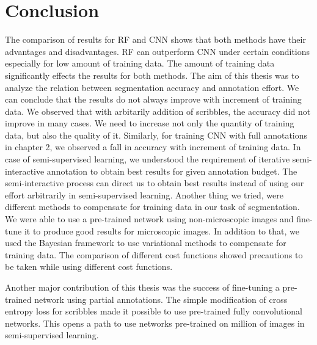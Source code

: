 %

\chapter{Conclusion}
The comparison of results for RF and CNN shows that both methods have their advantages and disadvantages. RF can outperform CNN under certain conditions especially for low amount of training data. The amount of training data significantly effects the results for both methods. The aim of this thesis was to analyze the relation between segmentation accuracy and annotation effort. We can conclude that the results do not always improve with increment of training data. We observed that with arbitarily addition of scribbles, the accuracy did not improve in many cases. We need to increase not only the quantity of training data, but also the quality of it. Similarly, for training CNN with full annotations in chapter 2, we observed a fall in accuracy with increment of training data.
In case of semi-supervised learning, we understood the requirement of iterative semi-interactive annotation to obtain best results for given annotation budget. The semi-interactive process can direct us to obtain best results instead of using our effort arbitrarily in semi-supervised learning. Another thing we tried, were different methods to compensate for training data in our task of segmentation. We were able to use a pre-trained network using non-microscopic images and fine-tune it to produce good results for microscopic images. In addition to that, we used the Bayesian framework to use variational methods to compensate for training data. The comparison of different cost functions showed precautions to be taken while using different cost functions. \par
Another major contribution of this thesis was the success of fine-tuning a pre-trained network using partial annotations. The simple modification of cross entropy loss for scribbles made it possible to use pre-trained fully convolutional networks. This opens a path to use networks pre-trained on million of images in semi-supervised learning. 
